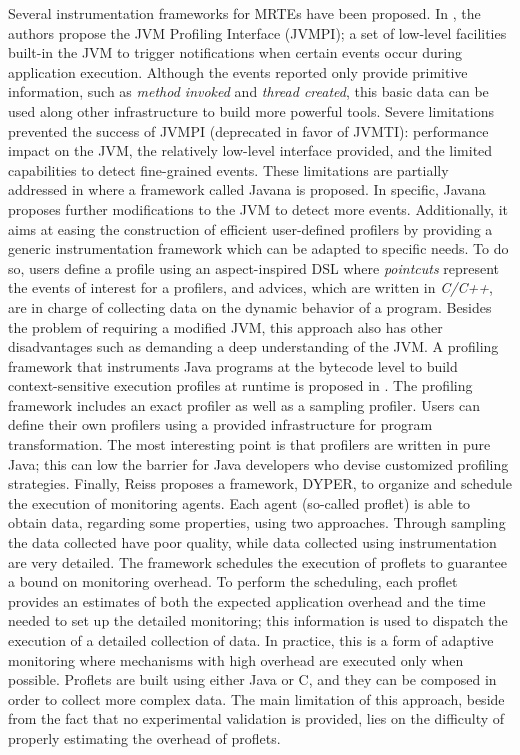 Several instrumentation frameworks for MRTEs have been proposed.
In \cite{Liang1999}, the authors propose the JVM Profiling Interface (JVMPI); a set of low-level facilities built-in the JVM to trigger notifications when certain events occur during application execution.
Although the events reported only provide primitive information, such as \textit{method invoked} and \textit{thread created}, this basic data can be used along other infrastructure to build more powerful tools.
Severe limitations prevented the success of JVMPI (deprecated in favor of JVMTI): performance impact on the JVM, the relatively low-level interface provided, and the limited capabilities to detect fine-grained events.
These limitations are partially addressed in \cite{Maebe06javana:a} where a framework called Javana is proposed.
In specific, Javana proposes further modifications to the JVM to detect more events.
Additionally, it aims at easing the construction of efficient user-defined profilers by providing a generic instrumentation framework which can be adapted to specific needs.
To do so, users define a profile using an aspect-inspired DSL where \textit{pointcuts} represent the events of interest for a profilers, and advices, which are written in \textit{C/C++}, are in charge of collecting data on the dynamic behavior of a program.
Besides the problem of requiring a modified JVM, this approach also has other disadvantages such as demanding a deep understanding of the JVM.
A profiling framework that instruments Java programs at the bytecode level to build context-sensitive execution profiles at runtime is proposed in \cite{Binder2005}.
The profiling framework includes an exact profiler as well as a sampling profiler.
Users can define their own profilers using a provided infrastructure for program transformation.
The most interesting point is that profilers are written in pure Java; this can low the barrier for Java developers who devise customized profiling strategies.
Finally, Reiss proposes \cite{Reiss:2008:CDP:1383559.1383566} a framework, DYPER, to organize and schedule the execution of monitoring agents.
Each agent (so-called proflet) is able to obtain data, regarding some properties, using two approaches.
Through sampling the data collected have poor quality, while data collected using instrumentation are very detailed.
The framework schedules the execution of proflets to guarantee a bound on monitoring overhead.
To perform the scheduling, each proflet provides an estimates of both the expected application overhead and the time needed to set up the detailed monitoring; this information is used to dispatch the execution of a detailed collection of data.
In practice, this is a form of adaptive monitoring where mechanisms with high overhead are executed only when possible.
Proflets are built using either Java or C, and they can be composed in order to collect more complex data.
The main limitation of this approach, beside from the fact that no experimental validation is provided, lies on the difficulty of properly estimating the overhead of proflets.

